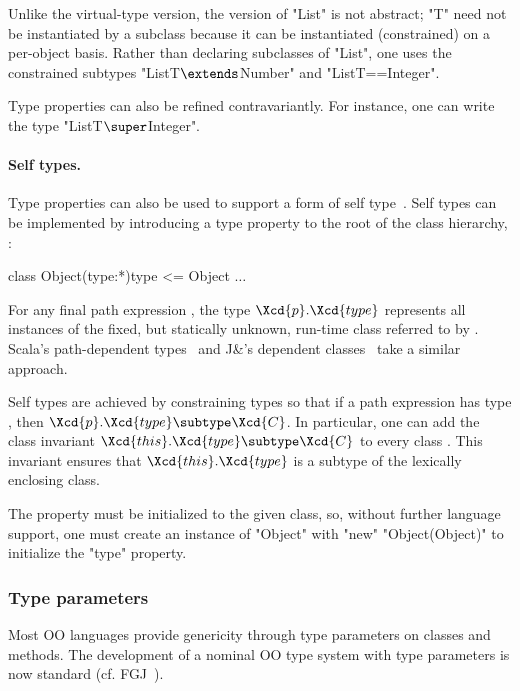 \noindent
Unlike the virtual-type version,
the \Xten{} version of \xcd"List" is not abstract;
\xcd"T" need not be instantiated by a subclass because it can be
instantiated (constrained) on a per-object basis.
Rather than declaring subclasses of \xcd"List",
one uses the constrained subtypes
\xcdmath"List{T$\extends$Number}" and \xcd"List{T==Integer}".

Type properties can also be refined contravariantly.
For instance, one can write the type \xcdmath"List{T$\super$Integer}".

\paragraph{Self types.}

Type properties can also be used to support a form of self
type~\cite{bruce-binary,bsg95}.
%
Self types can be implemented by introducing a
type property  to the root of the class hierarchy,
:
\begin{xtenmath}
class Object(type:*){type <= Object} { $\dots$ }
\end{xtenmath}

\noindent
For any final path expression , the type
$\Xcd{p}.\Xcd{type}$ represents all instances of the fixed,
but statically unknown, run-time class referred to by .
Scala's path-dependent types~\cite{scala} and J\&'s
dependent classes~\cite{nqm06}
take a similar approach.

Self types are achieved by
constraining types so that if a path expression 
has type , then
$\Xcd{p}.\Xcd{type} \subtype \Xcd{C}$.
In particular, one can add the class invariant
$\Xcd{this}.\Xcd{type} \subtype \Xcd{C}$ to every class .
This invariant ensures that
$\Xcd{this}.\Xcd{type}$ is a subtype
of the lexically enclosing class.

The property must be initialized to the given class, so, without
further language support, one must create an instance of
\xcd"Object" with \xcd"new" \xcd"Object(Object)" to initialize
the \xcd"type" property.

\subsubsection{Type parameters}

Most OO languages provide genericity through type parameters on
classes and methods.  The development of a nominal OO type
system with type parameters is now standard (cf.  FGJ~\cite{FJ}).


